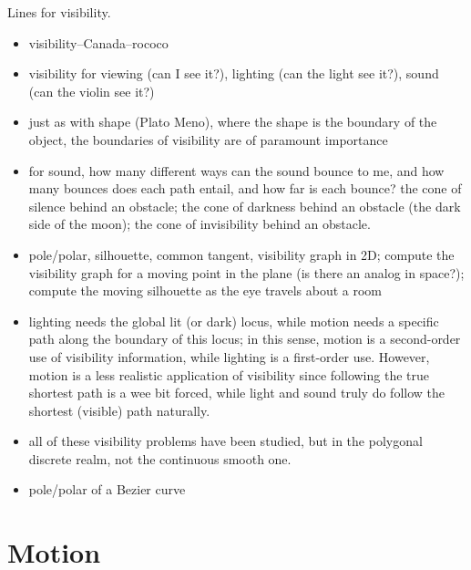 \documentclass[11pt,titlepage]{article}
\begin{document}
\clearpage



Lines for visibility.
\begin{itemize}
\item	visibility--Canada--rococo
\item	visibility for viewing (can I see it?), lighting (can the light see it?),
		sound (can the violin see it?)
\item	just as with shape (Plato Meno), where the shape is the boundary of the
		object, the boundaries of visibility are of paramount 
		importance
\item	for sound, how many different ways can the sound bounce to me,
		and how many bounces does each path entail, and how far
		is each bounce?
		the cone of silence behind an obstacle;
		the cone of darkness behind an obstacle (the dark side of the moon);
		the cone of invisibility behind an obstacle.
\item	pole/polar, silhouette, common tangent, visibility graph in 2D;
		compute the visibility graph for a moving point in the plane
		(is there an analog in space?);
		compute the moving silhouette as the eye travels about a room
		
\item	lighting needs the global lit (or dark) locus, while motion needs
	a specific path along the boundary of this locus;  in this sense,
	motion is a second-order use of visibility information,
	while lighting is a first-order use.  However, motion is a less 
	realistic application of visibility since following the true shortest
	path is a wee bit forced, while light and sound truly do follow
	the shortest (visible) path naturally.
\item	
	all of these visibility problems have been studied, but in the polygonal
	discrete realm, not the continuous smooth one.
	
\item	pole/polar of a Bezier curve
\end{itemize}
		












\clearpage
	
\section{Motion}
\end{document}
